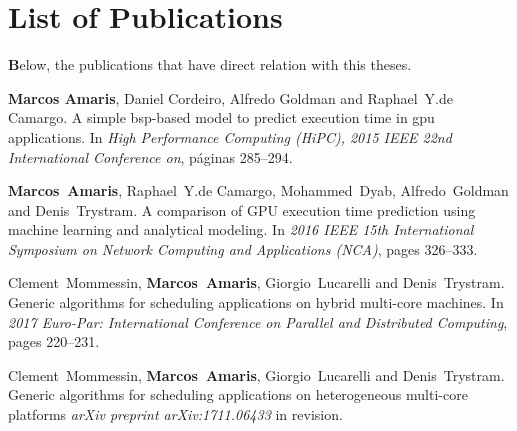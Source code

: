 \chapter{List of Publications}

\lettrine[findent=2pt]{\textbf{B}}{}elow, the publications that have direct relation with this theses.



\begin{itemize}
{\bf Marcos Amaris}, Daniel Cordeiro, Alfredo Goldman and Raphael~Y.de Camargo.
\newblock A simple bsp-based model to predict execution time in gpu
  applications.
\newblock In \emph{High Performance Computing (HiPC), 2015 IEEE 22nd
  International Conference on}, p\'{a}ginas 285--294.
  
{\bf Marcos~Amaris}, Raphael~Y.de Camargo, Mohammed~Dyab, Alfredo~Goldman and Denis~Trystram.
\newblock A comparison of GPU execution time prediction using machine learning
  and analytical modeling.
\newblock In \emph{2016 IEEE 15th International Symposium on Network Computing
  and Applications (NCA)}, pages 326--333.

Clement~Mommessin, {\bf Marcos~Amaris}, Giorgio~Lucarelli and Denis~Trystram.
\newblock Generic algorithms for scheduling applications on hybrid multi-core
  machines.
\newblock In \emph{2017 Euro-Par: International Conference on Parallel and
  Distributed Computing}, pages 220--231.
  
Clement~Mommessin, {\bf Marcos~Amaris}, Giorgio~Lucarelli and Denis~Trystram.
\newblock Generic algorithms for scheduling applications on heterogeneous multi-core platforms
\newblock \emph{arXiv preprint arXiv:1711.06433} in revision. 
 
\end{itemize}


